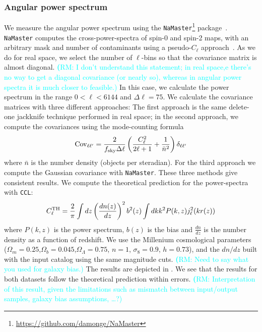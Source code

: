 \documentclass[twocolumn]{aastex62}
\newcommand{\rachel}[1]{{\textcolor{cyan}{{\textbf (RM: #1)}}}}
\begin{document}
\subsubsection{Angular power spectrum}
We measure the angular power spectrum using the \texttt{NaMaster}\footnote{\url{https://github.com/damonge/NaMaster}} package~\citep{Namaster}. \texttt{NaMaster} computes the cross-power-spectra of spin-0 and spin-2 maps, with an arbitrary mask and number of contaminants using a pseudo-$C_{\ell}$ approach~\citep{2002ApJ...567....2H,2017MNRAS.465.1847E}. As we do for real space, we select the number of $\ell$-bins so that the covariance matrix is almost diagonal. \rachel{I don't understand this statement; in real space,e there's no way to get a diagonal covariance (or nearly so), whereas in angular power spectra it is much closer to feasible.} In this case, we calculate the power spectrum in the range $0 < \ell < 6144$ and $\Delta \ell = 75$. We calculate the covariance matrices with three different approaches: The first approach is the same delete-one jackknife technique performed in real space; in the second approach, we compute the covariances using the mode-counting formula~\citep{Dodelson:1282338,2007MNRAS.381.1347C}
\begin{equation}
\mathrm{Cov}_{\ell\ell'}=\frac{2}{f_{\rm sky}\Delta\ell}\left(\frac{C_{\ell}^{2}}{2\ell+1}+\frac{1}{\bar{n}^{2}}\right)\delta_{\ell\ell'}
\end{equation}
where $\bar{n}$ is the number density (objects per steradian). For the third approach we compute the Gaussian covariance with \texttt{NaMaster}. These three methods give consistent results. We compute the theoretical prediction for the power-spectra with \texttt{CCL}:
\begin{equation}
C_{\ell}^{\rm TH} = \frac{2}{\pi}\int{dz} \left(\frac{dn(z)}{dz}\right)^{2} b^{2}(z) \int{dk k^{2} P(k,z)j^{2}_{\ell}(kr(z))}
\end{equation}
where $P(k,z)$ is the power spectrum, $b(z)$ is the bias and $\frac{dn}{dz}$ is the number density as a function of redshift. We use the Millenium cosmological parameters~\citep{2005Nature.435.629S} ($\Omega_{m}=0.25$,$\Omega_{b}=0.045$,$\Omega_{\Lambda}=0.75$, $n=1$, $\sigma_{8}=0.9$, $h=0.73$), and the $dn/dz$ built with the input catalog using the same magnitude cuts. \rachel{Need to say what you used for galaxy bias.} The results are depicted in . We see that the results for both datasets follow the theoretical prediction within errors. \rachel{Interpretation of this result, given the limitations such as mismatch between input/output samples, galaxy bias assumptions, \dots?}
\end{document}
